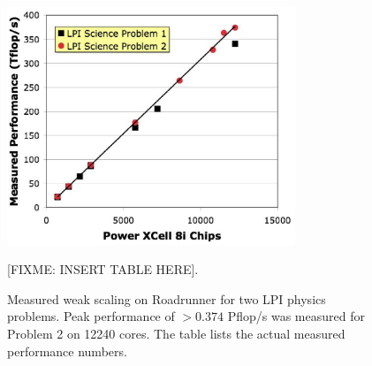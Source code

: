 \documentclass[journal,twoside]{IEEEtran}
\begin{document}
\begin{figure}
\begin{center}
\includegraphics[width=3.4in]{figs/weak_scaling.eps}

[FIXME: INSERT TABLE HERE]. 


\caption{Measured weak scaling on Roadrunner for two LPI physics problems. 
Peak performance of $>0.374$ Pflop/s
was measured for Problem 2 on 12240 cores.  The table lists the actual 
measured performance numbers.}
\label{fig:weakscaling}
\end{center}
\end{figure}










\end{document}
